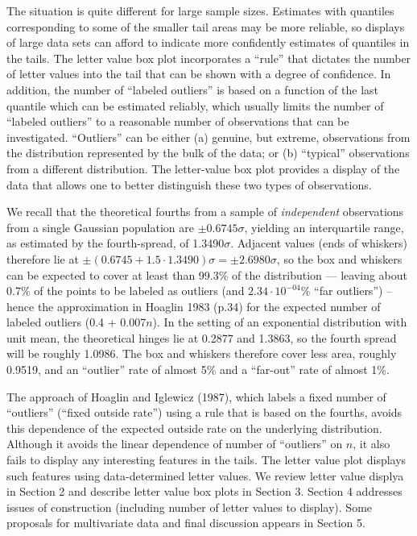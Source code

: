 \documentclass[11pt]{article}
\begin{document}
The situation is quite different for large sample sizes.
Estimates with quantiles corresponding to some of the smaller 
tail areas may be more reliable, so displays of large data sets 
can afford to indicate more confidently estimates of quantiles 
in the tails.  The letter
value box plot incorporates a ``rule'' that dictates the number of
letter values into the tail that can be shown with a degree of
confidence.  In addition, the number of ``labeled outliers'' is 
based on a function of the last quantile which can be estimated
reliably, which usually limits the number of ``labeled outliers'' 
to a reasonable number of observations that can be investigated.
``Outliers'' can be either (a) genuine, but extreme, observations
from the distribution represented by the bulk of the data; or 
(b) ``typical'' observations from a different distribution.
The letter-value box plot provides a display of the data that
allows one to better distinguish these two types of observations.

We recall that the theoretical fourths from a sample of
\textit{independent} observations from a single Gaussian 
population are $\pm  0.6745\sigma$, yielding an interquartile 
range, as estimated by the fourth-spread, of 1.3490$\sigma$.
Adjacent values (ends of whiskers) therefore lie at
$\pm (0.6745 + 1.5 \cdot 1.3490)\sigma = \pm 2.6980\sigma$,
so the box and whiskers can be expected to cover 
at least than 99.3\% of the distribution --- leaving 
about 0.7\% of the points to be labeled as outliers 
(and $2.34 \cdot 10^{-04}$\% ``far outliers'') -- hence the
approximation in Hoaglin 1983 (p.34) for the expected 
number of labeled outliers (0.4 + 0.007$n$).
In the setting of an exponential distribution with unit mean, 
the theoretical hinges lie at 0.2877 and 1.3863, so the fourth
spread will be roughly 1.0986.  The box and whiskers therefore
cover less area, roughly 0.9519, and an ``outlier'' rate
of almost 5\% and a ``far-out'' rate of almost 1\%.

The approach of Hoaglin and Iglewicz (1987), which
labels a fixed number of ``outliers'' (``fixed outside rate'')
using a rule that is based on the fourths, avoids this dependence 
of the expected outside rate on the underlying distribution.
Although it avoids the linear dependence of number of ``outliers''
on $n$, it also fails to display any interesting features in
the tails.  The letter value plot displays such features using
data-determined letter values.  We review letter value displya
in Section 2 and describe letter value box plots in Section 3.
Section 4 addresses issues of construction (including number
of letter values to display). Some proposals for multivariate
data and final discussion appears in Section 5.
\end{document}
